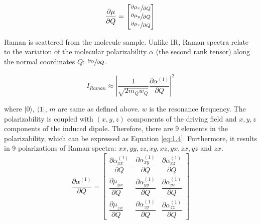 \begin{equation} \label{eq:1.2}
\frac{\partial\mu}{\partial Q} = \begin{bmatrix}
									\sfrac{\partial\mu_{x}}{\partial Q} \\
									\sfrac{\partial\mu_{y}}{\partial Q} \\
									\sfrac{\partial\mu_{z}}{\partial Q}
								  \end{bmatrix}
\end{equation}



Raman is scattered from the molecule sample. Unlike IR, Raman spectra relate to the variation of the molecular polarizability $\alpha$ (the second rank tensor) along the normal coordinates $Q$: $\sfrac{\partial\alpha}{\partial Q}$. 

\begin{equation} \label{eq:1.3}
I_{Raman} \approx \left| \frac{1}{\sqrt{2m_{Q}w_{Q}}} \frac{\partial\alpha^{(1)}}{\partial Q} \right|^{2}
\end{equation}

where $|0\rangle$, $\langle 1|$, $m$ are same as defined above. $w$ is the resonance frequency. The polarizability is coupled with $(x, y, z)$ components of the driving field and $x, y, z$ components of the induced dipole. Therefore, there are 9 elements in the polarizability, which can be expressed as Equation \ref{eq:1.4}. Furthermore, it results in 9 polarizations of Raman spectra: $xx, yy, zz, xy, xz, yx, zx, yz$ and $zx$. \\

\begin{equation} \label{eq:1.4}
\frac{\partial\alpha^{(1)}}{\partial Q} = \begin{bmatrix}
\dfrac{\partial\alpha_{xx}^{(1)}}{\partial Q} & \dfrac{\partial\alpha_{xy}^{(1)}}{\partial Q} & \dfrac{\partial\alpha_{xz}^{(1)}}{\partial Q} \\
\dfrac{\partial\mu_{yx}}{\partial Q} & \dfrac{\partial\alpha_{yy}^{(1)}}{\partial Q} & \dfrac{\partial\alpha_{yz}^{(1)}}{\partial Q}\\
\dfrac{\partial\mu_{zx}}{\partial Q} & \dfrac{\partial\alpha_{zy}^{(1)}}{\partial Q} & \dfrac{\partial\alpha_{zz}^{(1)}}{\partial Q}
\end{bmatrix}
\end{equation}

